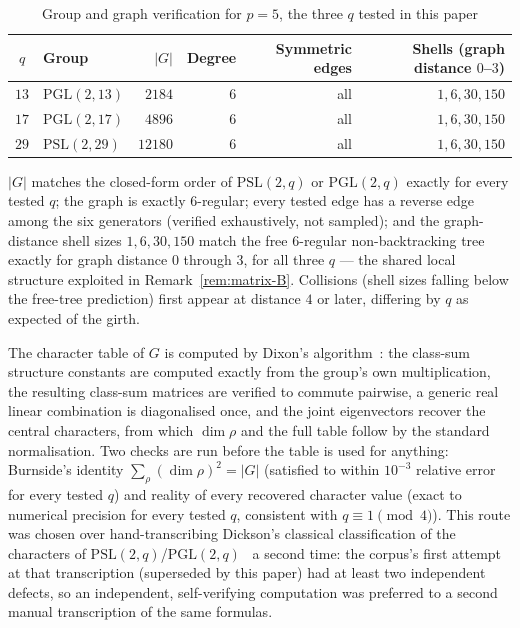 \documentclass[11pt,a4paper]{article}
\theoremstyle{plain}
\theoremstyle{definition}
\theoremstyle{remark}
\newcommand{\PSL}{\mathrm{PSL}}
\begin{document}
      \begin{table}[ht]
        \centering
        \caption{Group and graph verification for $p=5$, the three $q$ tested in this paper}
        \label{tab:group-verification}
        \begin{tabular}{c l r r r r}
          \toprule
          $q$ & Group & $|G|$ & Degree & Symmetric edges & Shells (graph distance $0$--$3$) \\
          \midrule
          $13$ & $\mathrm{PGL}(2,13)$ & $2184$ & $6$ & all & $1,6,30,150$ \\
          $17$ & $\mathrm{PGL}(2,17)$ & $4896$ & $6$ & all & $1,6,30,150$ \\
          $29$ & $\PSL(2,29)$         & $12180$ & $6$ & all & $1,6,30,150$ \\
          \bottomrule
        \end{tabular}
      \end{table}

      $|G|$ matches the closed-form order of $\PSL(2,q)$ or $\mathrm{PGL}(2,q)$ exactly for every
      tested $q$; the graph is exactly $6$-regular; every tested edge has a reverse edge among the
      six generators (verified exhaustively, not sampled); and the graph-distance shell sizes
      $1,6,30,150$ match the free $6$-regular non-backtracking tree exactly for graph distance
      $0$ through $3$, for all three $q$ --- the shared local structure exploited in
      Remark~\ref{rem:matrix-B}. Collisions (shell sizes falling below the free-tree prediction)
      first appear at distance $4$ or later, differing by $q$ as expected of the girth.

      The character table of $G$ is computed by Dixon's algorithm~\cite{Dixon1967}: the class-sum
      structure constants are computed exactly from the group's own multiplication, the resulting
      class-sum matrices are verified to commute pairwise, a generic real linear combination is
      diagonalised once, and the joint eigenvectors recover the central characters, from which
      $\dim\rho$ and the full table follow by the standard normalisation.
      Two checks are run before the table is used for anything: Burnside's identity
      $\sum_\rho (\dim\rho)^2 = |G|$ (satisfied to within $10^{-3}$ relative error for every tested
      $q$) and reality of every recovered character value (exact to numerical precision for every
      tested $q$, consistent with $q \equiv 1 \pmod 4$).
      This route was chosen over hand-transcribing Dickson's classical classification of the
      characters of $\PSL(2,q)$/$\mathrm{PGL}(2,q)$~\cite{PSLreps} a second time: the corpus's first
      attempt at that transcription (superseded by this paper) had at least two independent defects,
      so an independent, self-verifying computation was preferred to a second manual transcription of
      the same formulas.
\end{document}
